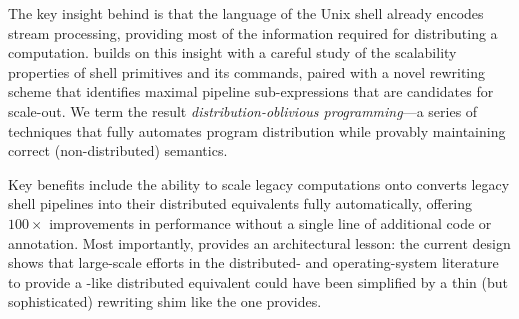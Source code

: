 \documentclass[sigplan,10pt,review,anonymous]{acmart}
\newcommand{\eg}{{\em e.g.}, }
\begin{document}


The key insight behind \sys is that the language of the Unix shell already encodes stream processing, providing most of the information required for distributing a computation.
\sys builds on this insight with a careful study of the scalability properties of shell primitives and its commands, paired with a novel rewriting scheme that identifies maximal pipeline sub-expressions that are candidates for scale-out.
We term the result \emph{distribution-oblivious programming}---a series of techniques that fully automates program distribution while provably maintaining correct (non-distributed) semantics.

Key benefits include the ability to scale legacy computations onto
\sys converts legacy shell pipelines into their distributed equivalents fully automatically, offering $100\times$ improvements in performance without a single line of additional code or annotation.
Most importantly, \sys provides an architectural lesson:
  the current design shows that large-scale efforts in the distributed- and operating-system literature to provide a \unix-like distributed equivalent could have been simplified by a thin (but sophisticated) rewriting shim like the one \sys provides.


% 
% 
% 
\end{document}
